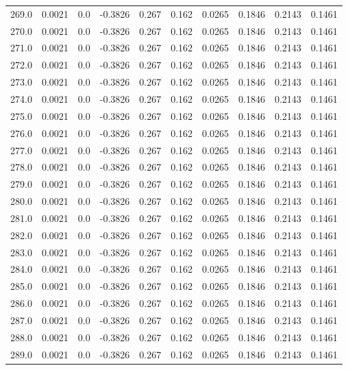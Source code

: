 \begin{longtable}{lrrrrrrrrr}
269.0 & 0.0021 & 0.0 & -0.3826 & 0.267 & 0.162 & 0.0265 & 0.1846 & 0.2143 & 0.1461 \\
270.0 & 0.0021 & 0.0 & -0.3826 & 0.267 & 0.162 & 0.0265 & 0.1846 & 0.2143 & 0.1461 \\
271.0 & 0.0021 & 0.0 & -0.3826 & 0.267 & 0.162 & 0.0265 & 0.1846 & 0.2143 & 0.1461 \\
272.0 & 0.0021 & 0.0 & -0.3826 & 0.267 & 0.162 & 0.0265 & 0.1846 & 0.2143 & 0.1461 \\
273.0 & 0.0021 & 0.0 & -0.3826 & 0.267 & 0.162 & 0.0265 & 0.1846 & 0.2143 & 0.1461 \\
274.0 & 0.0021 & 0.0 & -0.3826 & 0.267 & 0.162 & 0.0265 & 0.1846 & 0.2143 & 0.1461 \\
275.0 & 0.0021 & 0.0 & -0.3826 & 0.267 & 0.162 & 0.0265 & 0.1846 & 0.2143 & 0.1461 \\
276.0 & 0.0021 & 0.0 & -0.3826 & 0.267 & 0.162 & 0.0265 & 0.1846 & 0.2143 & 0.1461 \\
277.0 & 0.0021 & 0.0 & -0.3826 & 0.267 & 0.162 & 0.0265 & 0.1846 & 0.2143 & 0.1461 \\
278.0 & 0.0021 & 0.0 & -0.3826 & 0.267 & 0.162 & 0.0265 & 0.1846 & 0.2143 & 0.1461 \\
279.0 & 0.0021 & 0.0 & -0.3826 & 0.267 & 0.162 & 0.0265 & 0.1846 & 0.2143 & 0.1461 \\
280.0 & 0.0021 & 0.0 & -0.3826 & 0.267 & 0.162 & 0.0265 & 0.1846 & 0.2143 & 0.1461 \\
281.0 & 0.0021 & 0.0 & -0.3826 & 0.267 & 0.162 & 0.0265 & 0.1846 & 0.2143 & 0.1461 \\
282.0 & 0.0021 & 0.0 & -0.3826 & 0.267 & 0.162 & 0.0265 & 0.1846 & 0.2143 & 0.1461 \\
283.0 & 0.0021 & 0.0 & -0.3826 & 0.267 & 0.162 & 0.0265 & 0.1846 & 0.2143 & 0.1461 \\
284.0 & 0.0021 & 0.0 & -0.3826 & 0.267 & 0.162 & 0.0265 & 0.1846 & 0.2143 & 0.1461 \\
285.0 & 0.0021 & 0.0 & -0.3826 & 0.267 & 0.162 & 0.0265 & 0.1846 & 0.2143 & 0.1461 \\
286.0 & 0.0021 & 0.0 & -0.3826 & 0.267 & 0.162 & 0.0265 & 0.1846 & 0.2143 & 0.1461 \\
287.0 & 0.0021 & 0.0 & -0.3826 & 0.267 & 0.162 & 0.0265 & 0.1846 & 0.2143 & 0.1461 \\
288.0 & 0.0021 & 0.0 & -0.3826 & 0.267 & 0.162 & 0.0265 & 0.1846 & 0.2143 & 0.1461 \\
289.0 & 0.0021 & 0.0 & -0.3826 & 0.267 & 0.162 & 0.0265 & 0.1846 & 0.2143 & 0.1461 \\

\end{longtable}
